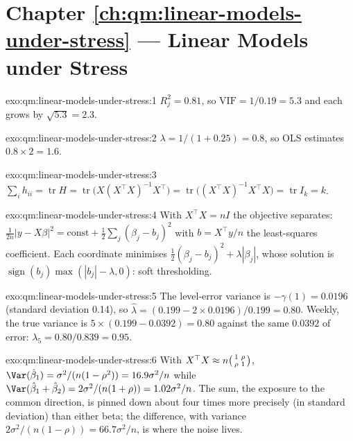 \section*{Chapter \ref{ch:qm:linear-models-under-stress} --- Linear Models under Stress}

\begin{solution}{exo:qm:linear-models-under-stress:1}
$R_j^2 = 0.81$, so $\mathrm{VIF} = 1/0.19 = 5.3$ and each  grows by $\sqrt{5.3} = 2.3$.
\end{solution}

\begin{solution}{exo:qm:linear-models-under-stress:2}
$\lambda = 1/(1 + 0.25) = 0.8$, so OLS estimates $0.8 \times 2 = 1.6$.
\end{solution}

\begin{solution}{exo:qm:linear-models-under-stress:3}
$\sum_ih_{ii} = \operatorname{tr}H = \operatorname{tr}\bigl(X(X^\top X)^{-1}X^\top\bigr) = \operatorname{tr}\bigl((X^\top X)^{-1}X^\top X\bigr) = \operatorname{tr}I_k = k$.
\end{solution}

\begin{solution}{exo:qm:linear-models-under-stress:4}
With $X^\top X = nI$ the objective separates: $\frac1{2n}\lvert y - X\beta\rvert^2 = \mathrm{const} + \frac12\sum_j(\beta_j - b_j)^2$ with $b = X^\top y/n$ the
least-squares coefficient. Each coordinate minimises $\frac12(\beta_j - b_j)^2 + \lambda|\beta_j|$, whose solution is $\operatorname{sign}(b_j)\max(|b_j| -
\lambda, 0)$: soft thresholding.
\end{solution}

\begin{solution}{exo:qm:linear-models-under-stress:5}
The level-error variance is $-\gamma(1) = 0.0196$ (standard deviation 0.14), so $\hat\lambda = (0.199 - 2 \times 0.0196)/0.199 = 0.80$. Weekly, the true
variance is $5 \times (0.199 - 0.0392) = 0.80$ against the same $0.0392$ of error: $\lambda_5 = 0.80/0.839 = 0.95$.
\end{solution}

\begin{solution}{exo:qm:linear-models-under-stress:6}
With $X^\top X \approx n\begin{psmallmatrix}1 & \rho\\ \rho & 1\end{psmallmatrix}$, $\Var(\hat\beta_1) = \sigma^2/(n(1 - \rho^2)) = 16.9\sigma^2/n$ while
$\Var(\hat\beta_1 + \hat\beta_2) = 2\sigma^2/(n(1 + \rho)) = 1.02\sigma^2/n$. The sum, the exposure to the common direction, is pinned down about four times
more precisely (in standard deviation) than either beta; the difference, with variance $2\sigma^2/(n(1 - \rho)) = 66.7\sigma^2/n$, is where the
noise lives.
\end{solution}

